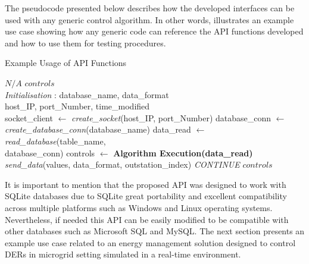 The pseudocode presented below describes how the developed interfaces can be used with any generic control algorithm. In other words, illustrates an example use case showing how any generic code can reference the API functions developed and how to use them for testing procedures. 

\begin{algorithm}[H]
 \caption{Example Usage of API Functions}
 \begin{algorithmic}[1]
 \renewcommand{\algorithmicrequire}{\textbf{Input: }}
 \renewcommand{\algorithmicensure}{\textbf{Output:}}
 \REQUIRE \(N/A\)
 \ENSURE  \(controls\)
 \\ \textit{Initialisation} : database\_name, data\_format\\
 host\_IP, port\_Number, time\_modified\\
  \STATE socket\_client $\leftarrow$ \textit{create\_socket}(host\_IP, port\_Number)
  \STATE database\_conn $\leftarrow$ \textit{create\_database\_conn}(database\_name)
  \STATE data\_read $\leftarrow$
  \textit{read\_database}(table\_name, 
  \\ database\_conn)
  \STATE controls $\leftarrow$ \textbf{Algorithm Execution(data\_read)}
  \STATE \textit{send\_data}(values, data\_format, outstation\_index)
  \ELSE 
  \STATE \textit{CONTINUE}
  \ENDIF
  \ENDWHILE
 \RETURN $controls$
 \end{algorithmic}
 \end{algorithm}



It is important to mention that the proposed API was designed to work with SQLite databases due to SQLite great portability and excellent compatibility across multiple platforms such as Windows and Linux operating systems. Nevertheless, if needed this API can be easily modified to be compatible with other databases such as Microsoft SQL and MySQL. The next section presents an example use case related to an energy management solution designed to control DERs in microgrid setting simulated in a real-time environment. 